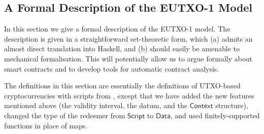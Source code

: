 \documentclass[a4paper]{article}
\newcommand{\s}{\textsf}  %
\newcommand{\script}{\ensuremath{\s{Script}}}
\newcommand{\ctx}{\ensuremath{\s{Context}}}
\newcommand{\Data}{\ensuremath{\s{Data}}}
\begin{document}
\subsection{A Formal Description of the EUTXO-1 Model}
\label{section:eutxo-spec}

In this section we give a formal description of the EUTXO-1 model.  The
description is given in a straightforward set-theoretic form, which
(a) admits an almost direct translation into Haskell, and (b) should
easily be amenable to mechanical formalisation.  This will potentially
allow us to argue formally about smart contracts and to develop tools
for automatic contract analysis.

The definitions in this section are essentially the definitions of
UTXO-based cryptocurrencies with scripts from
\citep{Zahnentferner18-UTxO}, except that we have added the new
features mentioned above (the validity interval, the datum,
and the \ctx{} structure), changed the type of the redeemer from
\script{} to \Data{}, and used finitely-supported functions in place
of maps.
\end{document}
